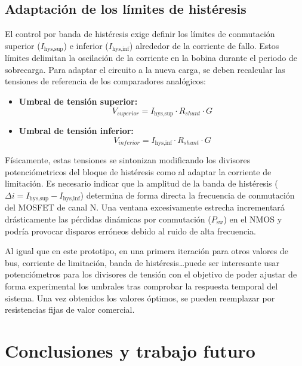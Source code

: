 \documentclass[12pt]{report} %
\begin{document}
\section{Adaptación de los límites de histéresis}

El control por banda de histéresis exige definir los límites de conmutación superior ($I_\text{hys,sup}$) e inferior ($I_\text{hys,inf}$) alrededor de la corriente de fallo. Estos límites delimitan la oscilación de la corriente en la bobina durante el periodo de sobrecarga. Para adaptar el circuito a la nueva carga, se deben recalcular las tensiones de referencia de los comparadores analógicos:
\begin{itemize}
    \item \textbf{Umbral de tensión superior:} 
    \begin{equation}
        V_{superior} = I_\text{hys,sup} \cdot R_{shunt} \cdot G
    \end{equation}
    \item \textbf{Umbral de tensión inferior:} 
    \begin{equation}
        V_{inferior} = I_\text{hys,inf} \cdot R_{shunt} \cdot G
    \end{equation}
\end{itemize}

Físicamente, estas tensiones se sintonizan modificando los divisores potenciómetricos del bloque de histéresis como al adaptar la corriente de limitación. Es necesario indicar que la amplitud de la banda de histéresis ($\Delta i = I_\text{hys,sup} - I_\text{hys,inf}$) determina de forma directa la frecuencia de conmutación del MOSFET de canal N. Una ventana excesivamente estrecha incrementará drásticamente las pérdidas dinámicas por conmutación ($P_\text{sw}$) en el NMOS y podría provocar disparos erróneos debido al ruido de alta frecuencia.

Al igual que en este prototipo, en una primera iteración para otros valores de bus, corriente de limitación, banda de histéresis\dots puede ser interesante usar potenciómetros para los divisores de tensión con el objetivo de poder ajustar de forma experimental los umbrales tras comprobar la respuesta temporal del sistema. Una vez obtenidos los valores óptimos, se pueden reemplazar por resistencias fijas de valor comercial.


\chapter{Conclusiones y trabajo futuro}
\label{ch:conclusiones}
\end{document}
